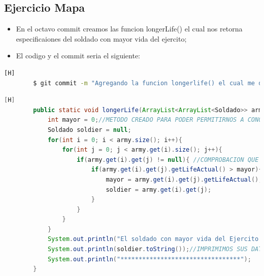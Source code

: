 \documentclass{article}
\begin{document}
	\subsection{Ejercicio Mapa}
	\begin{itemize}	
		\item En el octavo commit creamos las funcion longerLife() el cual nos retorna especificaiones del soldado con mayor vida del ejercito;
		\item El codigo y el commit seria el siguiente:
	\end{itemize}	
	\begin{lstlisting}[language=bash,caption={Commit}][H]
		$ git commit -m "Agregando la funcion longerlife() el cual me dara al soldado con mayor vida y sus especificaciones"
	\end{lstlisting}	
	\begin{lstlisting}[language=java,caption={Las lineas de codigos de la clase Mapa creada:}][H]
		public static void longerLife(ArrayList<ArrayList<Soldado>> army, String kingdom){
			int mayor = 0;//METODO CREADO PARA PODER PERMITIRNOS A CONOCER EL SOLDADO CON MAYOR VIDA DE CADA EJERCITO 
			Soldado soldier = null;
			for(int i = 0; i < army.size(); i++){
				for(int j = 0; j < army.get(i).size(); j++){
					if(army.get(i).get(j) != null){ //COMPROBACION QUE HACEMOS PARA PODER DECIR QUE EL CASILLERO DONDE ESTAMOS ES UN SOLDADO QUE EXISTE
						if(army.get(i).get(j).getLifeActual() > mayor){ //COMPARAMOS PUNTOS DE VIDA DE CADA SOLDADO PARA VER QUIEN ES EL MAYOR 
							mayor = army.get(i).get(j).getLifeActual();
							soldier = army.get(i).get(j);
						}
					}
				}
			}
			System.out.println("El soldado con mayor vida del Ejercito " + kingdom + " es: ");
			System.out.println(soldier.toString());//IMPRIMIMOS SUS DATOS PARA PODER VER DE QUE SOLDADO SE TRATA 
			System.out.println("*********************************");
		}
	\end{lstlisting}
\end{document}
